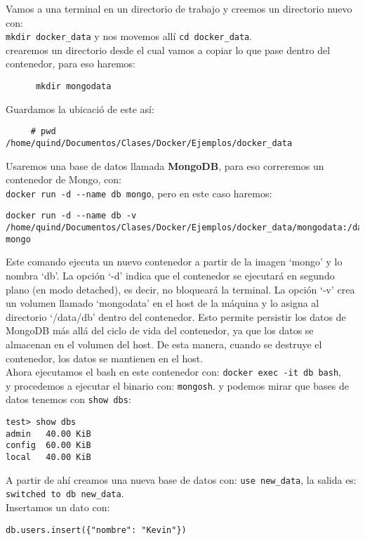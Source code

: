 \documentclass{article}
\begin{document}
Vamos a una terminal en un directorio de trabajo y creemos un directorio nuevo con:\\
 \lstinline{mkdir docker_data} y nos movemos allí \lstinline{cd docker_data}.\\
 crearemos un directorio desde el cual vamos a copiar lo que pase dentro del contenedor, para eso haremos:
 \begin{lstlisting}
      mkdir mongodata\end{lstlisting}
Guardamos la ubicació de este así:
 \begin{lstlisting}
     # pwd
/home/quind/Documentos/Clases/Docker/Ejemplos/docker_data \end{lstlisting}
Usaremos una base de datos llamada \textbf{MongoDB}, para eso correremos un contenedor de Mongo, con:\\
\lstinline{docker run -d --name db mongo}, pero en este caso haremos:
\begin{lstlisting}
docker run -d --name db -v /home/quind/Documentos/Clases/Docker/Ejemplos/docker_data/mongodata:/data/db mongo
\end{lstlisting}
Este comando ejecuta un nuevo contenedor a partir de la imagen \enquote*{mongo} y lo nombra \enquote*{db}. La opción \enquote*{-d} indica que el contenedor se ejecutará en segundo plano (en modo detached), es decir, no bloqueará la terminal. La opción \enquote*{-v} crea un volumen llamado \enquote*{mongodata} en el host de la máquina y lo asigna al directorio \enquote*{/data/db} dentro del contenedor. Esto permite persistir los datos de MongoDB más allá del ciclo de vida del contenedor, ya que los datos se almacenan en el volumen del host. De esta manera, cuando se destruye el contenedor, los datos se mantienen en el host.\\
Ahora ejecutamos el bash en este contenedor con: \lstinline{docker exec -it db bash},\\
y procedemos a ejecutar el binario con: \lstinline{mongosh}. y podemos mirar que bases de datos tenemos con \lstinline{show dbs}:
\begin{lstlisting}[numbers=none]
test> show dbs
admin   40.00 KiB
config  60.00 KiB
local   40.00 KiB        
\end{lstlisting}
A partir de ahí creamos una nueva base de datos con: \lstinline{use new_data}, la salida es: \lstinline{switched to db new_data}.\\
Insertamos un dato con: 
\begin{lstlisting}[numbers=none] 
db.users.insert({"nombre": "Kevin"})\end{lstlisting}
\end{document}
